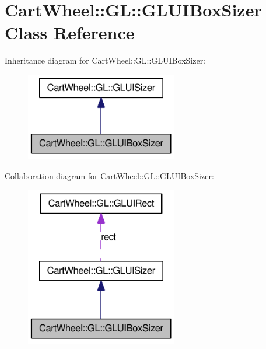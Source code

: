 \hypertarget{classCartWheel_1_1GL_1_1GLUIBoxSizer}{
\section{CartWheel::GL::GLUIBoxSizer Class Reference}
\label{classCartWheel_1_1GL_1_1GLUIBoxSizer}
}


Inheritance diagram for CartWheel::GL::GLUIBoxSizer:\nopagebreak
\begin{figure}[H]
\begin{center}
\leavevmode
\includegraphics[width=188pt]{classCartWheel_1_1GL_1_1GLUIBoxSizer__inherit__graph}
\end{center}
\end{figure}


Collaboration diagram for CartWheel::GL::GLUIBoxSizer:\nopagebreak
\begin{figure}[H]
\begin{center}
\leavevmode
\includegraphics[width=188pt]{classCartWheel_1_1GL_1_1GLUIBoxSizer__coll__graph}
\end{center}
\end{figure}
